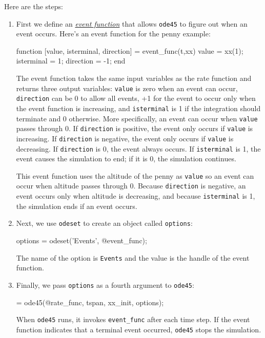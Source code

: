 \documentclass[../../book.tex]{subfiles}
\begin{document}
Here are the steps:


\begin{enumerate}

\item First we define an \href{https://www.mathworks.com/help/matlab/math/ode-event-location.html}{\emph{event function}} that allows \lstinline{ode45} to figure out when
an event occurs.  Here's an event function for the penny example:

\begin{code}
function [value, isterminal, direction] = event_func(t,xx)
    value = xx(1);
    isterminal = 1;
    direction = -1;
end
\end{code}

The event function takes the same input variables as the rate function and returns three output variables: \lstinline{value} is zero when an event can occur, \lstinline{direction} can be 0 to allow all events, +1 for the event to occur only when the event function is increasing, and \lstinline{isterminal} is 1 if the integration should terminate and 0 otherwise. 
More specifically, an event can occur when \lstinline{value} passes through 0.
If \lstinline{direction} is positive, the event only occurs if \lstinline{value} is increasing.
 If \lstinline{direction} is negative, the event only occurs if \lstinline{value} is decreasing.
If \lstinline{direction} is 0, the event always occurs.
If \lstinline{isterminal} is 1, the event causes the simulation to end; if it is 0, the simulation continues.

This event function uses the altitude of the penny as \lstinline{value} so an event can occur when altitude passes through 0.
Because \lstinline{direction} is negative, an event occurs only when altitude is decreasing, and
because \lstinline{isterminal} is 1, the simulation ends if an event occurs.


\item Next, we use \lstinline{odeset} to create an object called \lstinline{options}:

\begin{code}
options = odeset('Events', @event_func);
\end{code}
%
The name of the option is \lstinline{Events} and the value is the handle of the event function.

\item Finally, we pass \lstinline{options} as a fourth argument to \lstinline{ode45}:

\begin{code}
 = ode45(@rate_func, tspan, xx_init, options);
\end{code}

When \lstinline{ode45} runs, it invokes \lstinline{event_func} after each time step.  If the event function indicates that a terminal event occurred,
\lstinline{ode45} stops the simulation.

\end{enumerate}
\end{document}
